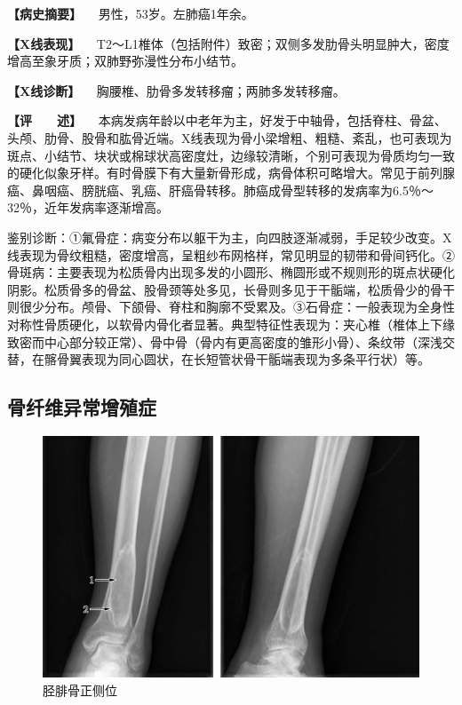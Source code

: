 \textbf{【病史摘要】} 　男性，53岁。左肺癌1年余。

\textbf{【X线表现】}
　T2～L1椎体（包括附件）致密；双侧多发肋骨头明显肿大，密度增高至象牙质；双肺野弥漫性分布小结节。

\textbf{【X线诊断】} 　胸腰椎、肋骨多发转移瘤；两肺多发转移瘤。

\textbf{【评　　述】}
　本病发病年龄以中老年为主，好发于中轴骨，包括脊柱、骨盆、头颅、肋骨、股骨和肱骨近端。X线表现为骨小梁增粗、粗糙、紊乱，也可表现为斑点、小结节、块状或棉球状高密度灶，边缘较清晰，个别可表现为骨质均匀一致的硬化似象牙样。有时骨膜下有大量新骨形成，病骨体积可略增大。常见于前列腺癌、鼻咽癌、膀胱癌、乳癌、肝癌骨转移。肺癌成骨型转移的发病率为6.5％～32％，近年发病率逐渐增高。

鉴别诊断：①氟骨症：病变分布以躯干为主，向四肢逐渐减弱，手足较少改变。X线表现为骨纹粗糙，密度增高，呈粗纱布网格样，常见明显的韧带和骨间钙化。②骨斑病：主要表现为松质骨内出现多发的小圆形、椭圆形或不规则形的斑点状硬化阴影。松质骨多的骨盆、股骨颈等处多见，长骨则多见于干骺端，松质骨少的骨干则很少分布。颅骨、下颌骨、脊柱和胸廓不受累及。③石骨症：一般表现为全身性对称性骨质硬化，以软骨内骨化者显著。典型特征性表现为：夹心椎（椎体上下缘致密而中心部分较正常）、骨中骨（骨内有更高密度的雏形小骨）、条纹带（深浅交替，在髂骨翼表现为同心圆状，在长短管状骨干骺端表现为多条平行状）等。

\subsection{骨纤维异常增殖症}

\begin{figure}[!htbp]
 \centering
 \includegraphics{./images/Image00108.jpg}
 \captionsetup{justification=centering}
 \caption{胫腓骨正侧位}
 \label{fig2-7-23}
  \end{figure} 

